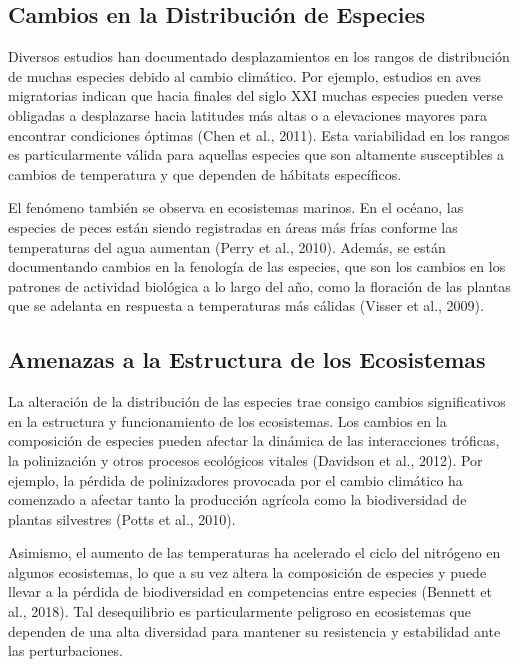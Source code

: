\documentclass[
  letterpaper,
  DIV=11,
  numbers=noendperiod,
  oneside]{scrreprt}
\begin{document}
\subsection{Cambios en la Distribución de
Especies}\label{cambios-en-la-distribuciuxf3n-de-especies}

Diversos estudios han documentado desplazamientos en los rangos de
distribución de muchas especies debido al cambio climático. Por ejemplo,
estudios en aves migratorias indican que hacia finales del siglo XXI
muchas especies pueden verse obligadas a desplazarse hacia latitudes más
altas o a elevaciones mayores para encontrar condiciones óptimas (Chen
et al., 2011). Esta variabilidad en los rangos es particularmente válida
para aquellas especies que son altamente susceptibles a cambios de
temperatura y que dependen de hábitats específicos.

El fenómeno también se observa en ecosistemas marinos. En el océano, las
especies de peces están siendo registradas en áreas más frías conforme
las temperaturas del agua aumentan (Perry et al., 2010). Además, se
están documentando cambios en la fenología de las especies, que son los
cambios en los patrones de actividad biológica a lo largo del año, como
la floración de las plantas que se adelanta en respuesta a temperaturas
más cálidas (Visser et al., 2009).

\subsection{Amenazas a la Estructura de los
Ecosistemas}\label{amenazas-a-la-estructura-de-los-ecosistemas}

La alteración de la distribución de las especies trae consigo cambios
significativos en la estructura y funcionamiento de los ecosistemas. Los
cambios en la composición de especies pueden afectar la dinámica de las
interacciones tróficas, la polinización y otros procesos ecológicos
vitales (Davidson et al., 2012). Por ejemplo, la pérdida de
polinizadores provocada por el cambio climático ha comenzado a afectar
tanto la producción agrícola como la biodiversidad de plantas silvestres
(Potts et al., 2010).

Asimismo, el aumento de las temperaturas ha acelerado el ciclo del
nitrógeno en algunos ecosistemas, lo que a su vez altera la composición
de especies y puede llevar a la pérdida de biodiversidad en competencias
entre especies (Bennett et al., 2018). Tal desequilibrio es
particularmente peligroso en ecosistemas que dependen de una alta
diversidad para mantener su resistencia y estabilidad ante las
perturbaciones.
\end{document}
